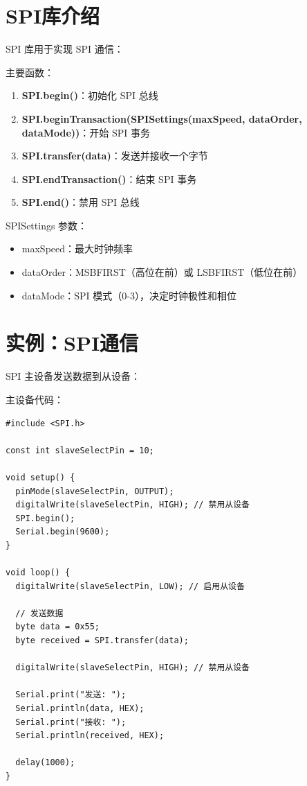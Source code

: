 \documentclass[12pt,UTF8]{ctexbook}
\begin{document}
\section{SPI库介绍}

SPI 库用于实现 SPI 通信：

主要函数：
\begin{enumerate}
    \item \textbf{SPI.begin()}：初始化 SPI 总线
    \item \textbf{SPI.beginTransaction(SPISettings(maxSpeed, dataOrder, dataMode))}：开始 SPI 事务
    \item \textbf{SPI.transfer(data)}：发送并接收一个字节
    \item \textbf{SPI.endTransaction()}：结束 SPI 事务
    \item \textbf{SPI.end()}：禁用 SPI 总线
\end{enumerate}

SPISettings 参数：
\begin{itemize}
    \item maxSpeed：最大时钟频率
    \item dataOrder：MSBFIRST（高位在前）或 LSBFIRST（低位在前）
    \item dataMode：SPI 模式（0-3），决定时钟极性和相位
\end{itemize}

\section{实例：SPI通信}

SPI 主设备发送数据到从设备：

主设备代码：
\begin{lstlisting}
#include <SPI.h>

const int slaveSelectPin = 10;

void setup() {
  pinMode(slaveSelectPin, OUTPUT);
  digitalWrite(slaveSelectPin, HIGH); // 禁用从设备
  SPI.begin();
  Serial.begin(9600);
}

void loop() {
  digitalWrite(slaveSelectPin, LOW); // 启用从设备
  
  // 发送数据
  byte data = 0x55;
  byte received = SPI.transfer(data);
  
  digitalWrite(slaveSelectPin, HIGH); // 禁用从设备
  
  Serial.print("发送: ");
  Serial.println(data, HEX);
  Serial.print("接收: ");
  Serial.println(received, HEX);
  
  delay(1000);
}
\end{lstlisting}
\end{document}
